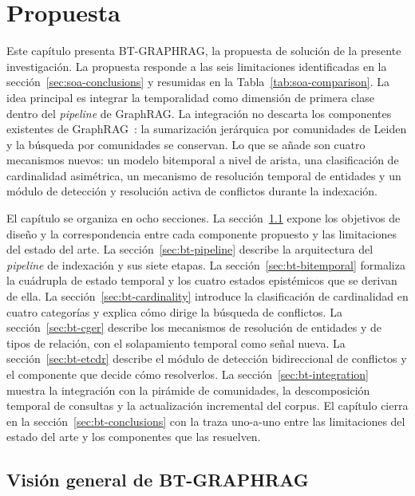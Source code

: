\chapter{Propuesta}\label{chapter:proposal}

Este capítulo presenta BT-GRAPHRAG, la propuesta de solución de la presente investigación. La propuesta responde a las seis limitaciones identificadas en la sección~\ref{sec:soa-conclusions} y resumidas en la Tabla~\ref{tab:soa-comparison}. La idea principal es integrar la temporalidad como dimensión de primera clase dentro del \emph{pipeline} de GraphRAG. La integración no descarta los componentes existentes de GraphRAG~\cite{edge2024local}: la sumarización jerárquica por comunidades de Leiden y la búsqueda por comunidades se conservan. Lo que se añade son cuatro mecanismos nuevos: un modelo bitemporal a nivel de arista, una clasificación de cardinalidad asimétrica, un mecanismo de resolución temporal de entidades y un módulo de detección y resolución activa de conflictos durante la indexación.

El capítulo se organiza en ocho secciones. La sección~\ref{sec:bt-overview} expone los objetivos de diseño y la correspondencia entre cada componente propuesto y las limitaciones del estado del arte. La sección~\ref{sec:bt-pipeline} describe la arquitectura del \emph{pipeline} de indexación y sus siete etapas. La sección~\ref{sec:bt-bitemporal} formaliza la cuádrupla de estado temporal y los cuatro estados epistémicos que se derivan de ella. La sección~\ref{sec:bt-cardinality} introduce la clasificación de cardinalidad en cuatro categorías y explica cómo dirige la búsqueda de conflictos. La sección~\ref{sec:bt-cger} describe los mecanismos de resolución de entidades y de tipos de relación, con el solapamiento temporal como señal nueva. La sección~\ref{sec:bt-etcdr} describe el módulo de detección bidireccional de conflictos y el componente que decide cómo resolverlos. La sección~\ref{sec:bt-integration} muestra la integración con la pirámide de comunidades, la descomposición temporal de consultas y la actualización incremental del corpus. El capítulo cierra en la sección~\ref{sec:bt-conclusions} con la traza uno-a-uno entre las limitaciones del estado del arte y los componentes que las resuelven.

\section{Visión general de BT-GRAPHRAG}\label{sec:bt-overview}

